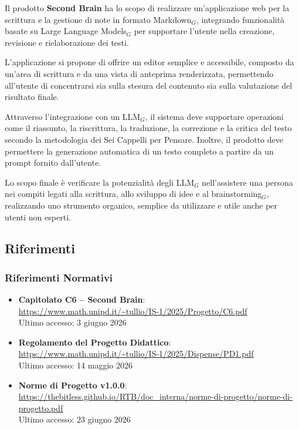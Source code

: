 ﻿\documentclass[a4paper, 10pt, colorlinks=true, linkcolor=black, urlcolor=blue, citecolor=blue, hidelinks]{article}
\newcommand{\reflink}[1]{{\footnotesize\underline{\url{#1}}}}
\begin{document}
Il prodotto \textbf{Second Brain} ha lo scopo di realizzare un'applicazione web per la scrittura e la gestione di note in formato Markdown$_G$, integrando funzionalità basate su Large Language Models$_G$ per supportare l'utente nella creazione, revisione e rielaborazione dei testi.

L'applicazione si propone di offrire un editor semplice e accessibile, composto da un'area di scrittura e da una vista di anteprima renderizzata, permettendo all'utente di concentrarsi sia sulla stesura del contenuto sia sulla valutazione del risultato finale.

Attraverso l'integrazione con un LLM$_G$, il sistema deve supportare operazioni come il riassunto, la riscrittura, la traduzione, la correzione e la critica del testo secondo la metodologia dei Sei Cappelli per Pensare. Inoltre, il prodotto deve permettere la generazione automatica di un testo completo a partire da un prompt fornito dall'utente.

Lo scopo finale è verificare la potenzialità degli LLM$_G$ nell'assistere una persona nei compiti legati alla scrittura, allo sviluppo di idee e al brainstorming$_G$, realizzando uno strumento organico, semplice da utilizzare e utile anche per utenti non esperti.


\subsection{Riferimenti}

\subsubsection{Riferimenti Normativi}
\begin{itemize}
    \item \textbf{Capitolato C6 -- Second Brain}: \\
    \reflink{https://www.math.unipd.it/~tullio/IS-1/2025/Progetto/C6.pdf} \\
    Ultimo accesso: 3 giugno 2026

    \item \textbf{Regolamento del Progetto Didattico}: \\
    \reflink{https://www.math.unipd.it/~tullio/IS-1/2025/Dispense/PD1.pdf} \\
    Ultimo accesso: 14 maggio 2026

    \item \textbf{Norme di Progetto v1.0.0}: \\
    \reflink{https://thebitless.github.io/RTB/doc_interna/norme-di-progetto/norme-di-progetto.pdf} \\
    Ultimo accesso: 23 giugno 2026
\end{itemize}
\end{document}
